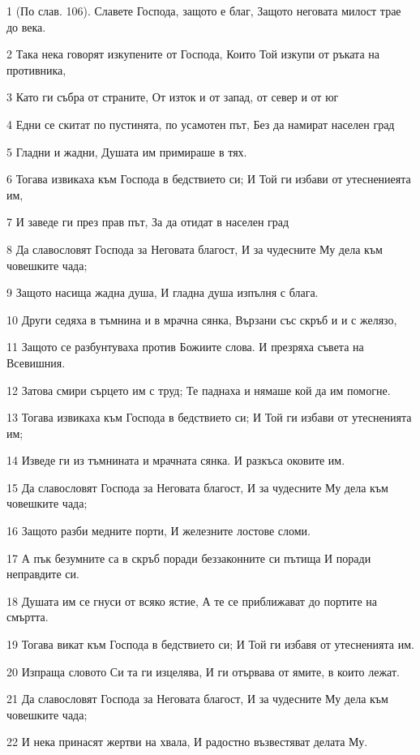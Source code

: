 \par 1 (По слав. 106). Славете Господа, защото е благ, Защото неговата милост трае до века.
\par 2 Така нека говорят изкупените от Господа, Които Той изкупи от ръката на противника,
\par 3 Като ги събра от страните, От изток и от запад, от север и от юг
\par 4 Едни се скитат по пустинята, по усамотен път, Без да намират населен град
\par 5 Гладни и жадни, Душата им примираше в тях.
\par 6 Тогава извикаха към Господа в бедствието си; И Той ги избави от утеснениеята им,
\par 7 И заведе ги през прав път, За да отидат в населен град
\par 8 Да славословят Господа за Неговата благост, И за чудесните Му дела към човешките чада;
\par 9 Защото насища жадна душа, И гладна душа изпълня с блага.
\par 10 Други седяха в тъмнина и в мрачна сянка, Вързани със скръб и и с желязо,
\par 11 Защото се разбунтуваха против Божиите слова. И презряха съвета на Всевишния.
\par 12 Затова смири сърцето им с труд; Те паднаха и нямаше кой да им помогне.
\par 13 Тогава извикаха към Господа в бедствието си; И Той ги избави от утесненията им;
\par 14 Изведе ги из тъмнината и мрачната сянка. И разкъса оковите им.
\par 15 Да славословят Господа за Неговата благост, И за чудесните Му дела към човешките чада;
\par 16 Защото разби медните порти, И железните лостове сломи.
\par 17 А пък безумните са в скръб поради беззаконните си пътища И поради неправдите си.
\par 18 Душата им се гнуси от всяко ястие, А те се приближават до портите на смъртта.
\par 19 Тогава викат към Господа в бедствието си; И Той ги избавя от утесненията им.
\par 20 Изпраща словото Си та ги изцелява, И ги отървава от ямите, в които лежат.
\par 21 Да славословят Господа за Неговата благост, И за чудесните Му дела към човешките чада;
\par 22 И нека принасят жертви на хвала, И радостно възвестяват делата Му.
